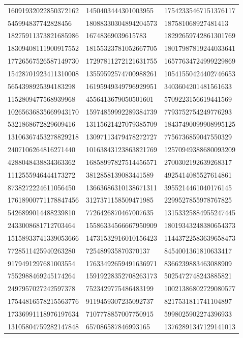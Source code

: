 \begin{longtable}{*{3}{l}}
16091932022850372162&1450403444301003955&17542335467151376117\\
545994837742828456&18088330304894204573&187581068927481413\\
18275911373821685986&16748369039615783&18292659742861301769\\
18309408111900917552&18155323781052667705&18017987819244033641\\
17726567526587149730&17297811272121631755&16577634724999229869\\
15428701923411310008&13559592574700988261&10541550424402746653\\
5654398925394183298&16195949349796929951&3403604201481561633\\
1152809477568939968&4556413679050501601&5709223156619441569\\
10265636835669943170&15974859992289384739&7793752754249776293\\
5321868672829609416&13115621427079385709&18437490099908995125\\
13106367453278829218&13097113479478272727&7756736859047550329\\
2407106264816271440&10163843123863821769&12570949388680093209\\
4288048438834363362&16858997827514456571&2700302192639268317\\
1112555946444173272&3812858139083441589&4925414085527614861\\
8738272224611056450&13663686310138671311&3955214461040176145\\
17618900771178847456&3127371158509471985&2299527855978767825\\
5426899014488239810&7726426870467007635&13153325884955247445\\
2433008681712703464&15586334566667950909&18019343248380654373\\
15158933741339053666&14731532916010156423&11443722583639658473\\
7728511425940263280&725489935870370137&8454001361810633417\\
9179491297681003554&17633492659491636971&8366239883463088909\\
7552988469245174264&15919228352708263173&5025472748243885821\\
2497957027242597378&7523429775486483199&10021386802729080577\\
17544816578215563776&9119459307235092737&8217531811741104897\\
17336991118976197634&7107778857007750915&5998025902274396933\\
13105804759282147848&657086587846993165&13762891347129141013\\

\end{longtable}
